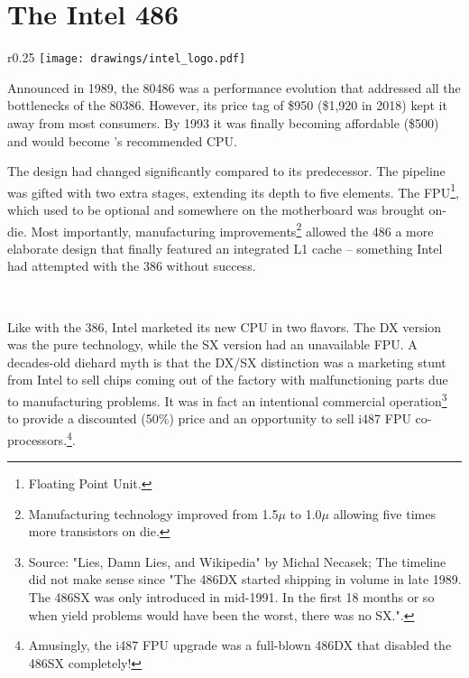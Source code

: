 \section{The Intel 486}

\begin{wrapfigure}[5]{r}{0.25\textwidth}
\centering
\texttt{[image: drawings/intel\_logo.pdf]}
\end{wrapfigure}

Announced in 1989, the 80486 was a performance evolution that addressed all the bottlenecks of the 80386. However, its price tag of \$950 (\$1,920 in 2018) kept it away from most consumers. By 1993 it was finally becoming affordable (\$500) and would become \doom{}'s recommended CPU.\\
\par
The design had changed significantly compared to its predecessor. The pipeline was gifted with two extra stages, extending its depth to five elements. The FPU\footnote{Floating Point Unit.}, which used to be optional and somewhere on the motherboard was brought on-die. Most importantly, manufacturing improvements\footnote{Manufacturing technology improved from 1.5$\mu$ to 1.0$\mu$ allowing five times more transistors on die.} allowed the 486 a more elaborate design that finally featured an integrated L1 cache -- something Intel had attempted with the 386 without success.\\
\par
{}\\
\par
{
\setlength{\belowcaptionskip}{-10pt}
}
\pagebreak
Like with the 386, Intel marketed its new CPU in two flavors. The DX version was the pure technology, while the SX version had an unavailable FPU. A decades-old diehard myth is that the DX/SX distinction was a marketing stunt from Intel to sell chips coming out of the factory with malfunctioning parts due to manufacturing problems. It was in fact an intentional commercial operation\footnote{Source: "Lies, Damn Lies, and Wikipedia" by Michal Necasek; The timeline did not make sense since "The 486DX started shipping in volume in late 1989. The 486SX was only introduced in mid-1991. In the first 18 months or so when yield problems would have been the worst, there was no SX.".} to provide a discounted (50\%) price and an opportunity to sell i487 FPU co-processors.\footnote{Amusingly, the i487 FPU upgrade was a full-blown 486DX that disabled the 486SX completely!}.\\
